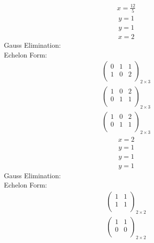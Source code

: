 \documentclass{article}
\begin{document}
\begin{align*}
x=\frac{12}{5}\end{align*}
\begin{align*}
y=1\end{align*}
\begin{align*}
y=1\end{align*}
\begin{align*}
x=2\end{align*}
Gauss Elimination:\\
Echelon Form:\\
\begin{align*}
\left(
\begin{array}{cc|c}
0 & 1 & 1\\
1 & 0 & 2\\
\end{array}
\right)_{2\times 3}
\end{align*}
\begin{align*}
\left(
\begin{array}{cc|c}
1 & 0 & 2\\
0 & 1 & 1\\
\end{array}
\right)_{2\times 3}
\end{align*}
\begin{align*}
\left(
\begin{array}{cc|c}
1 & 0 & 2\\
0 & 1 & 1\\
\end{array}
\right)_{2\times 3}
\end{align*}
\begin{align*}
x=2\end{align*}
\begin{align*}
y=1\end{align*}
\begin{align*}
y=1\end{align*}
\begin{align*}
y=1\end{align*}
Gauss Elimination:\\
Echelon Form:\\
\begin{align*}
\left(
\begin{array}{c|c}
1 & 1\\
1 & 1\\
\end{array}
\right)_{2\times 2}
\end{align*}
\begin{align*}
\left(
\begin{array}{c|c}
1 & 1\\
0 & 0\\
\end{array}
\right)_{2\times 2}
\end{align*}
\end{document}
